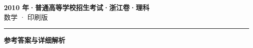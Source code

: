 \documentclass[zihao=5, a4paper]{ctexart}
\begin{document}
\begin{center}
  {\Large\bfseries 2010 年·普通高等学校招生考试·浙江卷·理科}\\[4pt]
  {\large 数学 · 印刷版}
\end{center}
\medskip
{}

\par\bigskip\hrule\bigskip
{}
\begin{center}{\large\bfseries 参考答案与详细解析}\end{center}
\smallskip

\end{document}
